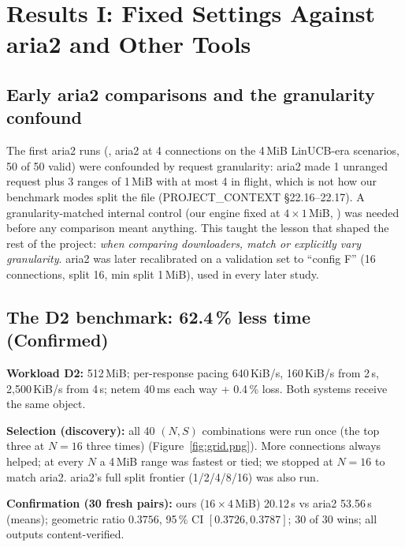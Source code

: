 \chapter{Results I: Fixed Settings Against aria2 and Other Tools}\label{ch:aria2}

\section{Early aria2 comparisons and the granularity confound}
The first aria2 runs (, aria2 at 4 connections on the 4\,MiB LinUCB-era scenarios, 50 of 50 valid) were confounded by request granularity: aria2 made 1 unranged request plus 3 ranges of 1\,MiB with at most 4 in flight, which is not how our benchmark modes split the file (PROJECT\_CONTEXT §22.16--22.17). A granularity-matched internal control (our engine fixed at $4\times1$\,MiB, ) was needed before any comparison meant anything. This taught the lesson that shaped the rest of the project: \emph{when comparing downloaders, match or explicitly vary granularity}. aria2 was later recalibrated on a validation set to ``config F'' (16 connections, split 16, min split 1\,MiB), used in every later study.

\section{The D2 benchmark: 62.4\,\% less time (Confirmed)}
\textbf{Workload D2:} 512\,MiB; per-response pacing 640\,KiB/s, 160\,KiB/s from 2\,s, 2{,}500\,KiB/s from 4\,s; netem 40\,ms each way + 0.4\,\% loss. Both systems receive the same object.

\textbf{Selection (discovery):} all 40 $(N,S)$ combinations were run once (the top three at $N=16$ three times) (Figure~\ref{fig:grid.png}). More connections always helped; at every $N$ a 4\,MiB range was fastest or tied; we stopped at $N=16$ to match aria2. aria2's full split frontier (1/2/4/8/16) was also run.

\textbf{Confirmation (30 fresh pairs):} ours ($16\times4$\,MiB) 20.12\,s vs aria2 53.56\,s (means); geometric ratio $\mathbf{0.3756}$, 95\,\% CI $[0.3726, 0.3787]$; 30 of 30 wins; all outputs content-verified.

